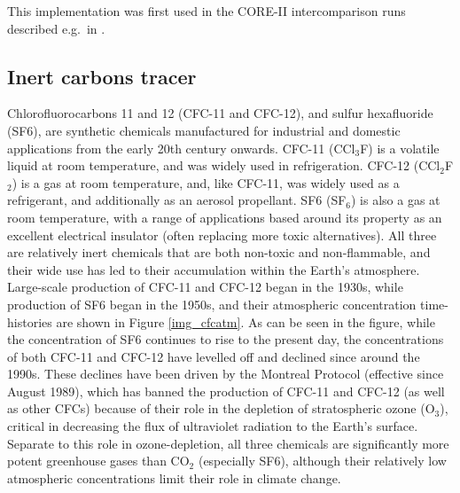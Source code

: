 \documentclass[../main/TOP_manual]{subfiles}
\begin{document}
 This implementation was first used in the CORE-II intercomparison runs described e.g.\ in \citet{danabasoglu_2014}.

\subsection{Inert carbons tracer}

%

Chlorofluorocarbons 11 and 12 (CFC-11 and CFC-12), and sulfur hexafluoride (SF6), are synthetic chemicals manufactured for industrial and domestic applications from the early 20th century onwards.
CFC-11 (CCl$_{3}$F) is a volatile liquid at room temperature, and was widely used in refrigeration. CFC-12 (CCl$_{2}$F$_{2}$) is a gas at room temperature, and, like CFC-11, was widely used as a refrigerant,
and additionally as an aerosol propellant. SF6 (SF$_{6}$) is also a gas at room temperature, with a range of applications based around its property as an excellent electrical insulator (often replacing more toxic alternatives).
All three are relatively inert chemicals that are both non-toxic and non-flammable, and their wide use has led to their accumulation within the Earth's atmosphere. Large-scale production of CFC-11 and CFC-12 began in the 1930s, while production of SF6 began in the 1950s, and their atmospheric concentration time-histories are shown in Figure \ref{img_cfcatm}.
As can be seen in the figure, while the concentration of SF6 continues to rise to the present  day, the concentrations of both CFC-11 and CFC-12 have levelled off and declined since around the 1990s.
These declines have been driven by the Montreal Protocol (effective since August 1989), which has banned the production of CFC-11 and CFC-12 (as well as other CFCs) because of their role in the depletion of
stratospheric ozone (O$_{3}$), critical in decreasing the flux of ultraviolet radiation to the Earth's surface. Separate to this role in ozone-depletion, all three chemicals are significantly more potent greenhouse gases
than CO$_{2}$ (especially SF6), although their relatively low atmospheric concentrations limit their role in climate change. \\

\end{document}

